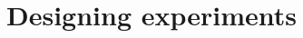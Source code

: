 \documentclass[final]{beamer}%
\begin{document}
%
%
%
%
%
%



\section{Designing experiments}

\end{document}
